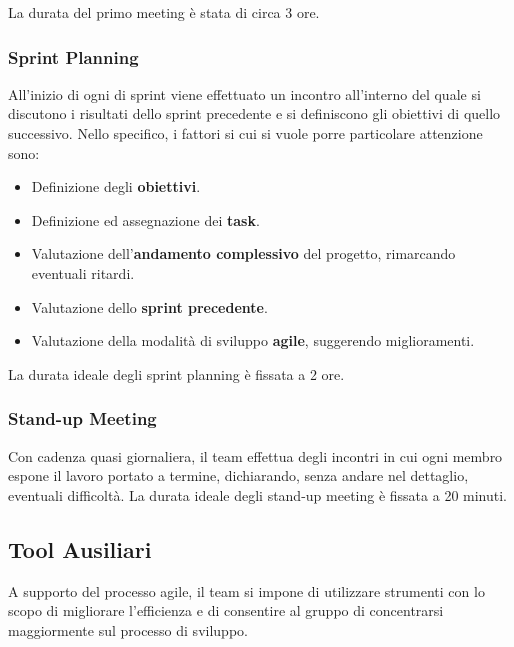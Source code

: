 La durata del primo meeting è stata di circa 3 ore.

\subsubsection{Sprint Planning}
All'inizio di ogni di sprint viene effettuato un incontro all'interno del quale si discutono i risultati dello sprint precedente e si definiscono gli obiettivi di quello successivo. Nello specifico, i fattori si cui si vuole porre particolare attenzione sono:
\begin{itemize}
    \item Definizione degli \textbf{obiettivi}.
    \item Definizione ed assegnazione dei \textbf{task}.
    \item Valutazione dell'\textbf{andamento complessivo} del progetto, rimarcando eventuali ritardi.
    \item Valutazione dello \textbf{sprint precedente}.
    \item Valutazione della modalità di sviluppo \textbf{agile}, suggerendo miglioramenti.
\end{itemize}
La durata ideale degli sprint planning è fissata a 2 ore.

\subsubsection{Stand-up Meeting}
Con cadenza quasi giornaliera, il team effettua degli incontri in cui ogni membro espone il lavoro portato a termine, dichiarando, senza andare nel dettaglio, eventuali difficoltà. La durata ideale degli stand-up meeting è fissata a 20 minuti.

\subsection{Tool Ausiliari}
A supporto del processo agile, il team si impone di utilizzare strumenti con lo scopo di migliorare l’efficienza e di consentire al gruppo di concentrarsi maggiormente sul processo di sviluppo.

